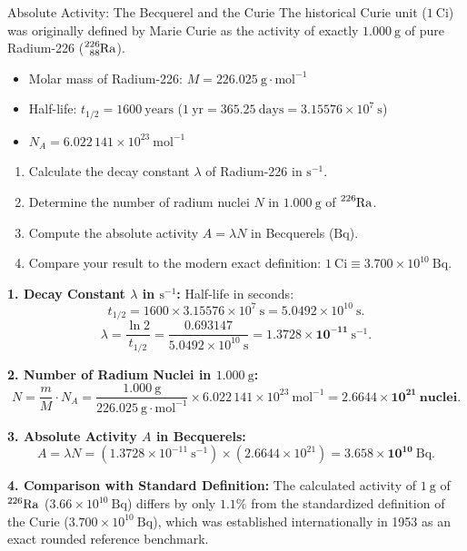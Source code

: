\begin{exercise}{Absolute Activity: The Becquerel and the Curie}
The historical Curie unit ($1\ \mathrm{Ci}$) was originally defined by Marie Curie as the activity of exactly $1.000\ \mathrm{g}$ of pure Radium-226 ($\ce{^{226}_{88}Ra}$).
\begin{itemize}[itemsep=1pt]
  \item Molar mass of Radium-226: $M = 226.025\ \mathrm{g\cdot mol^{-1}}$
  \item Half-life: $t_{1/2} = 1600\ \mathrm{years}$ ($1\ \mathrm{yr} = 365.25\ \mathrm{days} = 3.15576 \times 10^7\ \mathrm{s}$)
  \item $N_A = 6.022\,141 \times 10^{23}\ \mathrm{mol^{-1}}$
\end{itemize}
\begin{enumerate}[leftmargin=1.5em,itemsep=2pt]
  \item Calculate the decay constant $\lambda$ of Radium-226 in $\mathrm{s^{-1}}$.
  \item Determine the number of radium nuclei $N$ in $1.000\ \mathrm{g}$ of $\ce{^{226}Ra}$.
  \item Compute the absolute activity $A = \lambda N$ in Becquerels ($\mathrm{Bq}$).
  \item Compare your result to the modern exact definition: $1\ \mathrm{Ci} \equiv 3.700 \times 10^{10}\ \mathrm{Bq}$.
\end{enumerate}
\end{exercise}

\begin{tabletworkspace}[5.0cm]
\end{tabletworkspace}

\begin{solution}
\textbf{1. Decay Constant $\lambda$ in $\mathrm{s^{-1}}$:}
Half-life in seconds:
\[
t_{1/2} = 1600 \times 3.15576 \times 10^7\ \mathrm{s} = 5.0492 \times 10^{10}\ \mathrm{s}.
\]
\[
\lambda = \frac{\ln 2}{t_{1/2}} = \frac{0.693147}{5.0492 \times 10^{10}\ \mathrm{s}} = \mathbf{1.3728 \times 10^{-11}\ \mathrm{s^{-1}}}.
\]

\textbf{2. Number of Radium Nuclei in $1.000\ \mathrm{g}$:}
\[
N = \frac{m}{M} \cdot N_A = \frac{1.000\ \mathrm{g}}{226.025\ \mathrm{g\cdot mol^{-1}}} \times 6.022\,141 \times 10^{23}\ \mathrm{mol^{-1}} = \mathbf{2.6644 \times 10^{21}\ \text{nuclei}}.
\]

\textbf{3. Absolute Activity $A$ in Becquerels:}
\[
A = \lambda N = (1.3728 \times 10^{-11}\ \mathrm{s^{-1}}) \times (2.6644 \times 10^{21}) = \mathbf{3.658 \times 10^{10}\ \mathrm{Bq}}.
\]

\textbf{4. Comparison with Standard Definition:}
The calculated activity of $1\ \mathrm{g}$ of $^{226}\ce{Ra}$ ($3.66 \times 10^{10}\ \mathrm{Bq}$) differs by only $1.1\%$ from the standardized definition of the Curie ($3.700 \times 10^{10}\ \mathrm{Bq}$), which was established internationally in 1953 as an exact rounded reference benchmark.
\end{solution}

